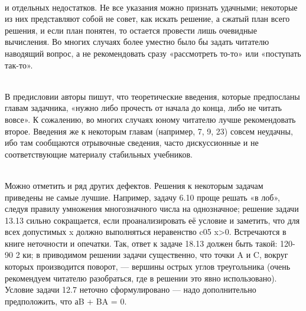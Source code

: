 \newpage
\fancyfoot[R]{\thepage} 
\pagecolor[rgb]{1,1,1}
\begin{multicols}{3}
\footnotesize
\\ и отдельных недостатков. Не все указания можно признать удачными; некоторые из них представляют собой не совет, как искать решение, а сжатый план всего решения, и если план понятен, то остается провести лишь очевидные вычисления. Во многих случаях более уместно было бы задать читателю наводящий вопрос, а не рекомендовать сразу «рассмотреть то-то» или «поступать так-то».

\\В предисловии авторы пишут, что теоретические введения, которые предпосланы главам задачника, «нужно либо прочесть от начала до конца, либо не читать вовсе». К сожалению, во многих случаях юному читателю лучше рекомендовать второе. Введения же к некоторым главам (например, 7, 9, 23) совсем неудачны, ибо там сообщаются отрывочные сведения, часто дискуссионные и не соответствующие материалу стабильных учебников.

\\Можно отметить и ряд других дефектов. Решения к некоторым задачам приведены не самые лучшие. Например, задачу 6.10 проще решать «в лоб», следуя правилу умножения многозначного числа на однозначное; решение задачи 13.13 сильно сокращается, если проанализировать её условие и заметить, что для всех допустимых x должно выполняться неравенство c05 x>0. Встречаются в книге неточности и опечатки. Так, ответ к задаче 18.13 должен быть такой: 120-90 2 ки; в приводимом решении задачи существенно, что точки A и C, вокруг которых производится поворот, — вершины острых углов треугольника (очень рекомендуем читателю разобраться, где в решении это явно использовано). Условие задачи 12.7 неточно сформулировано — надо дополнительно предположить, что аB + BA = 0.


\end{multicols}
